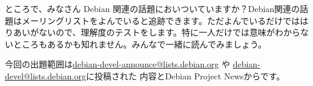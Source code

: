 \documentclass[mingoth,a4paper]{jsarticle}
\begin{document}
ところで、みなさん Debian 関連の話題においついていますか？Debian関連の話
題はメーリングリストをよんでいると追跡できます。ただよんでいるだけではは
りあいがないので、理解度のテストをします。特に一人だけでは意味がわからな
いところもあるかも知れません。みんなで一緒に読んでみましょう。

今回の出題範囲は\url{debian-devel-announce@lists.debian.org} や \url{debian-devel@lists.debian.org}に投稿された
内容とDebian Project Newsからです。

\begin{multicols}{2}






\end{multicols}


\cleartooddpage
\end{document}
